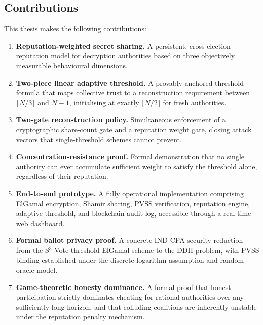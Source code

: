 \documentclass[12pt,a4paper]{article}
\theoremstyle{definition}
\theoremstyle{remark}
\begin{document}
\subsection{Contributions}

This thesis makes the following contributions:

\begin{enumerate}[label=\textbf{C\arabic*.}, leftmargin=3em]
  \item \textbf{Reputation-weighted secret sharing.} A persistent,
    cross-election reputation model for decryption authorities based on
    three objectively measurable behavioural dimensions.

  \item \textbf{Two-piece linear adaptive threshold.} A provably anchored
    threshold formula that maps collective trust to a reconstruction requirement
    between $\lceil N/3 \rceil$ and $N-1$, initialising at exactly
    $\lceil N/2 \rceil$ for fresh authorities.

  \item \textbf{Two-gate reconstruction policy.} Simultaneous enforcement
    of a cryptographic share-count gate and a reputation weight gate,
    closing attack vectors that single-threshold schemes cannot prevent.

  \item \textbf{Concentration-resistance proof.} Formal demonstration that
    no single authority can ever accumulate sufficient weight to satisfy
    the threshold alone, regardless of their reputation.

  \item \textbf{End-to-end prototype.} A fully operational implementation
    comprising ElGamal encryption, Shamir sharing, PVSS verification,
    reputation engine, adaptive threshold, and blockchain audit log,
    accessible through a real-time web dashboard.

  \item \textbf{Formal ballot privacy proof.} A concrete IND-CPA security
    reduction from the S$^3$-Vote threshold ElGamal scheme to the DDH
    problem, with PVSS binding established under the discrete logarithm
    assumption and random oracle model.

  \item \textbf{Game-theoretic honesty dominance.} A formal proof that
    honest participation strictly dominates cheating for rational
    authorities over any sufficiently long horizon, and that colluding
    coalitions are inherently unstable under the reputation penalty
    mechanism.
\end{enumerate}
\end{document}
